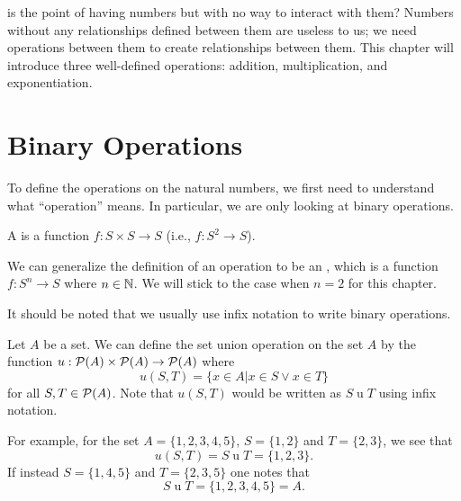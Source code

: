 \label{chapter:operations-on-naturals}
 is the point of having numbers but with no way to interact with them? Numbers without any relationships defined between them are useless to us; we need operations between them to create relationships between them. This chapter will introduce three well-defined operations: addition, multiplication, and exponentiation.

\section{Binary Operations}
To define the operations on the natural numbers, we first need to understand what ``operation'' means. In particular, we are only looking at binary operations.

\begin{definition}
    A  is a function $f: S \times S \to S$ (i.e., $f: S^2 \to S$).
\end{definition}
\begin{remark}
    We can generalize the definition of an operation to be an , which is a function $f: S^n \to S$ where $n \in \mathbb{N}$. We will stick to the case when $n = 2$ for this chapter.
\end{remark}

It should be noted that we usually use infix notation to write binary operations.

\begin{example}
    \setlength{\parindent}{1.5em}
    
    Let $A$ be a set. We can define the set union operation on the set $A$ by the function $u: {\mathcal{P}(A)} \times {\mathcal{P}(A)} \to {\mathcal{P}(A)}$ where
    \[
        u(S, T) = \{x \in A \vert x \in S \lor x \in T\}
    \]
    for all $S, T \in {\mathcal{P}(A)}$. Note that $u(S, T)$ would be written as $S\mathrel{u}T$ using infix notation.

    For example, for the set $A = \{1, 2, 3, 4, 5\}$, $S = \{1, 2\}$ and $T = \{2, 3\}$, we see that
    \[
        u(S, T) = S\mathrel{u}T = \{1, 2, 3\}.
    \]
    If instead $S = \{1, 4, 5\}$ and $T = \{2, 3, 5\}$ one notes that
    \[
        S\mathrel{u}T = \{1, 2, 3, 4, 5\} = A.
    \]
\end{example}

